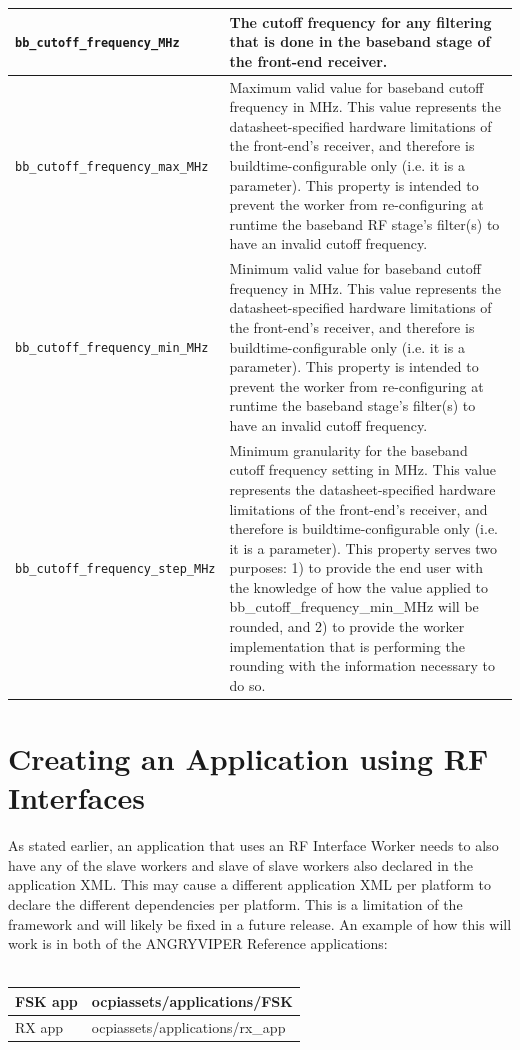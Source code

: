 \begin{longtable}{|p{5cm}|p{12cm}|}
			\hline
			\verb+bb_cutoff_frequency_MHz+      & The cutoff frequency for any filtering that is done in the baseband stage of the front-end receiver. \\
			\hline
			\verb+bb_cutoff_frequency_max_MHz+  & Maximum valid value for baseband cutoff frequency in MHz. This value represents the datasheet-specified hardware limitations of the front-end's receiver, and therefore is buildtime-configurable only (i.e. it is a parameter). This property is intended to prevent the worker from re-configuring at runtime the baseband RF stage's filter(s) to have an invalid cutoff frequency. \\
			\hline
			\verb+bb_cutoff_frequency_min_MHz+  & Minimum valid value for baseband cutoff frequency in MHz. This value represents the datasheet-specified hardware limitations of the front-end's receiver, and therefore is buildtime-configurable only (i.e. it is a parameter). This property is intended to prevent the worker from re-configuring at runtime the baseband stage's filter(s) to have an invalid cutoff frequency. \\
			\hline
			\verb+bb_cutoff_frequency_step_MHz+ & Minimum granularity for the baseband cutoff frequency setting in MHz. This value represents the datasheet-specified hardware limitations of the front-end's receiver, and therefore is buildtime-configurable only (i.e. it is a parameter). This property serves two purposes: 1) to provide the end user with the knowledge of how the value applied to bb\_cutoff\_frequency\_min\_MHz will be rounded, and 2) to provide the worker implementation that is performing the rounding with the information necessary to do so. \\
			\hline
		\end{longtable}
\newpage
\section{Creating an Application using RF Interfaces}
As stated earlier, an application that uses an RF Interface Worker needs to also have any of the slave workers and slave of slave workers also declared in the application XML.  This may cause a different application XML per platform to declare the different dependencies per platform.  This is a limitation of the framework and will likely be fixed in a future release.  An example of how this will work is in both of the ANGRYVIPER Reference applications: \\ \\
   \begin{tabular}{|p{2cm}|p{7cm}|}
      \hline
      FSK app & ocpiassets/applications/FSK \\
      \hline
      RX app & ocpiassets/applications/rx\_app  \\
      \hline
   \end{tabular}
   \\

